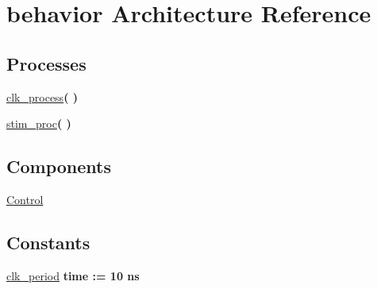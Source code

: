 \hypertarget{class_control__tb_1_1behavior}{\section{behavior \-Architecture \-Reference}
\label{class_control__tb_1_1behavior}
}
\*
\*
\subsection*{\-Processes}
 \begin{DoxyCompactItemize}
\item 
\hypertarget{class_control__tb_1_1behavior_ac5bb218131b813f7908ec89476b31fca}{\hyperlink{class_control__tb_1_1behavior_ac5bb218131b813f7908ec89476b31fca}{clk\-\_\-process}{\bfseries  (  )}}\label{class_control__tb_1_1behavior_ac5bb218131b813f7908ec89476b31fca}

\item 
\hypertarget{class_control__tb_1_1behavior_ad2efa6785cff833c341e27596b21aeb5}{\hyperlink{class_control__tb_1_1behavior_ad2efa6785cff833c341e27596b21aeb5}{stim\-\_\-proc}{\bfseries  (  )}}\label{class_control__tb_1_1behavior_ad2efa6785cff833c341e27596b21aeb5}

\end{DoxyCompactItemize}
\subsection*{\-Components}
 \begin{DoxyCompactItemize}
\item 
\hypertarget{class_control__tb_1_1behavior_ae13bdad23d6f2d32595962543b489fb9}{\hyperlink{class_control__tb_1_1behavior_ae13bdad23d6f2d32595962543b489fb9}{\-Control}  {\bfseries }  }\label{class_control__tb_1_1behavior_ae13bdad23d6f2d32595962543b489fb9}

\end{DoxyCompactItemize}
\subsection*{\-Constants}
 \begin{DoxyCompactItemize}
\item 
\hypertarget{class_control__tb_1_1behavior_a13e9f2c03e76b8759ca75c4759b3aed6}{\hyperlink{class_control__tb_1_1behavior_a13e9f2c03e76b8759ca75c4759b3aed6}{clk\-\_\-period} {\bfseries time  \-:=  10  ns } }\label{class_control__tb_1_1behavior_a13e9f2c03e76b8759ca75c4759b3aed6}

\end{DoxyCompactItemize}
